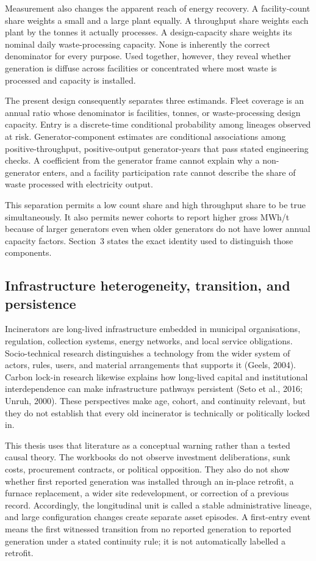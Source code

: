 \documentclass[12pt,letterpaper]{article}
\begin{document}
Measurement also changes the apparent reach of energy recovery. A facility-count
share weights a small and a large plant equally. A throughput share weights each
plant by the tonnes it actually processes. A design-capacity share weights its
nominal daily waste-processing capacity. None is inherently the correct
denominator for every purpose. Used together, however, they reveal whether
generation is diffuse across facilities or concentrated where most waste is
processed and capacity is installed.

The present design consequently separates three estimands. Fleet coverage is an
annual ratio whose denominator is facilities, tonnes, or waste-processing design
capacity. Entry is a discrete-time conditional probability among lineages
observed at risk. Generator-component estimates are conditional associations
among positive-throughput, positive-output generator-years that pass stated
engineering checks. A coefficient from the generator frame cannot explain why a
non-generator enters, and a facility participation rate cannot describe the
share of waste processed with electricity output.

This separation permits a low count share and high throughput share to be true
simultaneously. It also permits newer cohorts to report higher gross MWh/t
because of larger generators even when older generators do not have lower annual
capacity factors. Section~3 states the exact identity used to distinguish those
components.

\subsection{Infrastructure heterogeneity, transition, and persistence}

Incinerators are long-lived infrastructure embedded in municipal organisations,
regulation, collection systems, energy networks, and local service obligations.
Socio-technical research distinguishes a technology from the wider system of
actors, rules, users, and material arrangements that supports it (Geels, 2004).
Carbon lock-in research likewise explains how long-lived capital and
institutional interdependence can make infrastructure pathways persistent
(Seto et al., 2016; Unruh, 2000). These perspectives make age, cohort, and
continuity relevant, but they do not establish that every old incinerator is
technically or politically locked in.

This thesis uses that literature as a conceptual warning rather than a tested
causal theory. The workbooks do not observe investment deliberations, sunk
costs, procurement contracts, or political opposition. They also do not show
whether first reported generation was installed through an in-place retrofit, a
furnace replacement, a wider site redevelopment, or correction of a previous
record. Accordingly, the longitudinal unit is called a stable administrative
lineage, and large configuration changes create separate asset episodes. A
first-entry event means the first witnessed transition from no reported
generation to reported generation under a stated continuity rule; it is not
automatically labelled a retrofit.
\end{document}
